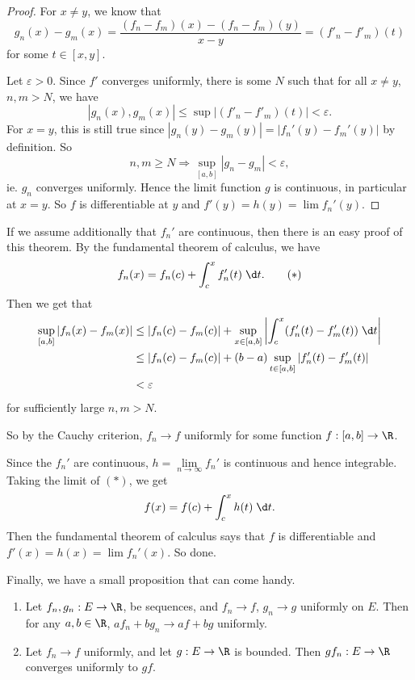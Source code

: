 \documentclass[a4paper]{article}
\begin{document}
\begin{proof}
  For $x \not = y$, we know that
  \[
    g_n(x) - g_m(x) = \frac{(f_n - f_m)(x) - (f_n - f_m)(y)}{x - y} = (f'_n - f'_m)(t)
  \]
  for some $t \in [x, y]$.

  Let $\varepsilon > 0$. Since $f'$ converges uniformly, there is some $N$ such that for all $x\not= y$, $n, m > N$, we have
  \[
    |g_n(x), g_m(x)| \leq \sup |(f'_n - f'_m)(t)| < \varepsilon.
  \]
  For $x = y$, this is still true since $|g_n(y) - g_m(y)| = |f_n'(y) - f_m'(y)|$ by definition. So
  \[
    n, m\geq N \Rightarrow \sup_{[a, b]}|g_n - g_m| < \varepsilon,
  \]
  ie. $g_n$ converges uniformly. Hence the limit function $g$ is continuous, in particular at $x = y$. So $f$ is differentiable at $y$ and $f'(y) = h(y) = \lim f_n'(y)$.
\end{proof}

If we assume additionally that $f_n'$ are continuous, then there is an easy proof of this theorem. By the fundamental theorem of calculus, we have
\[
  f_n(x) = f_n(c) + \int_c^x f_n'(t)\;\d t.\tag{$*$}
\]
Then we get that
\begin{align*}
  \sup_{[a, b]}|f_n(x) - f_m(x)| &\leq |f_n(c) - f_m(c)| + \sup_{x\in [a, b]}\left|\int_c^x (f_n'(t) - f_m'(t))\;\d t\right|\\
  &\leq |f_n(c) - f_m(c)| + (b - a)\sup_{t\in [a, b]}|f_n'(t) - f_m'(t)|\\
  &< \varepsilon
\end{align*}
for sufficiently large $n, m> N$.

So by the Cauchy criterion, $f_n \to f$ uniformly for some function $f: [a, b] \to \R$.

Since the $f_n'$ are continuous, $h = \lim\limits_{n\to \infty} f_n'$ is continuous and hence integrable. Taking the limit of $(*)$, we get
\[
  f(x) = f(c) + \int_c^x h(t)\;\d t.
\]
Then the fundamental theorem of calculus says that $f$ is differentiable and $f'(x) = h(x) = \lim f_n'(x)$. So done.

Finally, we have a small proposition that can come handy.
\begin{prop}\leavevmode
  \begin{enumerate}
    \item Let $f_n, g_n: E\to \R$, be sequences, and $f_n \to f$, $g_n \to g$ uniformly on $E$. Then for any $a, b\in \R$, $af_n + bg_n \to af + bg$ uniformly.
    \item Let $f_n \to f$ uniformly, and let $g: E\to \R$ is bounded. Then $gf_n: E\to \R$ converges uniformly to $gf$.
  \end{enumerate}
\end{prop}
\end{document}
